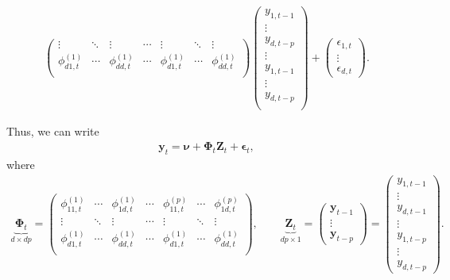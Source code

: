 \documentclass[fleqn]{article}
\begin{document}
\begin{align*}
\begin{pmatrix}
        \vdots & \ddots & \vdots
        & \cdots &
        \vdots & \ddots & \vdots \\
        \phi^{(1)}_{d1, t} & \cdots & \phi^{(1)}_{dd, t}
        & \cdots &
        \phi^{(1)}_{d1, t} & \cdots & \phi^{(1)}_{dd, t} \\
    \end{pmatrix}
    \begin{pmatrix}
        y_{1, t-1} \\
        \vdots \\
        y_{d, t-p} \\
        \vdots \\
        y_{1, t-1} \\
        \vdots \\
        y_{d, t-p} \\
    \end{pmatrix}
    +
    \begin{pmatrix}
        \epsilon_{1, t} \\
        \vdots \\
        \epsilon_{d, t}
    \end{pmatrix}.
\end{align*}

Thus, we can write
\begin{align*}
    \bm y_t = \bm \nu + \bm \Phi_t \bm Z_t + \bm \epsilon_t,
\end{align*}
where
\begin{align*}
    \underbrace{\bm \Phi_t}_{d \times dp} = \begin{pmatrix}
        \phi^{(1)}_{11, t} & \cdots & \phi^{(1)}_{1d, t}
        & \cdots &
        \phi^{(p)}_{11, t} & \cdots & \phi^{(p)}_{1d, t} \\
        \vdots & \ddots & \vdots
        & \cdots &
        \vdots & \ddots & \vdots \\
        \phi^{(1)}_{d1, t} & \cdots & \phi^{(1)}_{dd, t}
        & \cdots &
        \phi^{(1)}_{d1, t} & \cdots & \phi^{(1)}_{dd, t} \\
    \end{pmatrix},
    \qquad
    \underbrace{\bm Z_t}_{dp \times 1} = \begin{pmatrix}
        \bm y_{t-1} \\
        \vdots \\
        \bm y_{t-p}
    \end{pmatrix}
    = \begin{pmatrix}
        y_{1, t-1} \\
        \vdots \\
        y_{d, t-1} \\
        \vdots \\
        y_{1, t-p} \\
        \vdots \\
        y_{d, t-p}
    \end{pmatrix}.
\end{align*}
\end{document}
